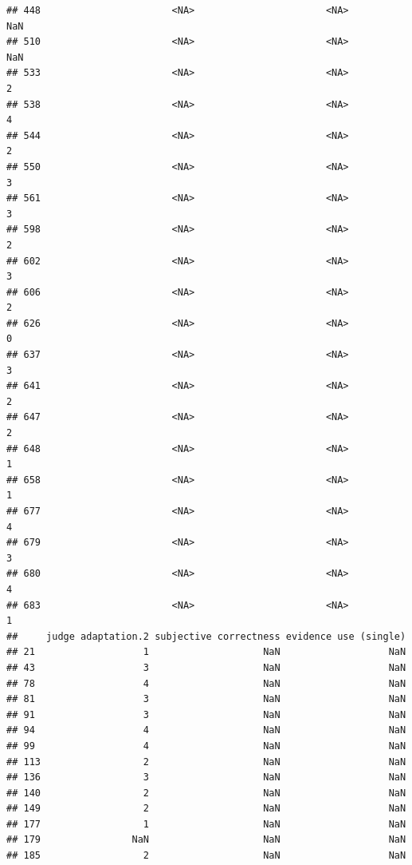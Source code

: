 \documentclass[
]{article}
\begin{document}
\begin{verbatim}
## 448                       <NA>                       <NA>                NaN
## 510                       <NA>                       <NA>                NaN
## 533                       <NA>                       <NA>                  2
## 538                       <NA>                       <NA>                  4
## 544                       <NA>                       <NA>                  2
## 550                       <NA>                       <NA>                  3
## 561                       <NA>                       <NA>                  3
## 598                       <NA>                       <NA>                  2
## 602                       <NA>                       <NA>                  3
## 606                       <NA>                       <NA>                  2
## 626                       <NA>                       <NA>                  0
## 637                       <NA>                       <NA>                  3
## 641                       <NA>                       <NA>                  2
## 647                       <NA>                       <NA>                  2
## 648                       <NA>                       <NA>                  1
## 658                       <NA>                       <NA>                  1
## 677                       <NA>                       <NA>                  4
## 679                       <NA>                       <NA>                  3
## 680                       <NA>                       <NA>                  4
## 683                       <NA>                       <NA>                  1
##     judge adaptation.2 subjective correctness evidence use (single)
## 21                   1                    NaN                   NaN
## 43                   3                    NaN                   NaN
## 78                   4                    NaN                   NaN
## 81                   3                    NaN                   NaN
## 91                   3                    NaN                   NaN
## 94                   4                    NaN                   NaN
## 99                   4                    NaN                   NaN
## 113                  2                    NaN                   NaN
## 136                  3                    NaN                   NaN
## 140                  2                    NaN                   NaN
## 149                  2                    NaN                   NaN
## 177                  1                    NaN                   NaN
## 179                NaN                    NaN                   NaN
## 185                  2                    NaN                   NaN

\end{verbatim}
\end{document}
